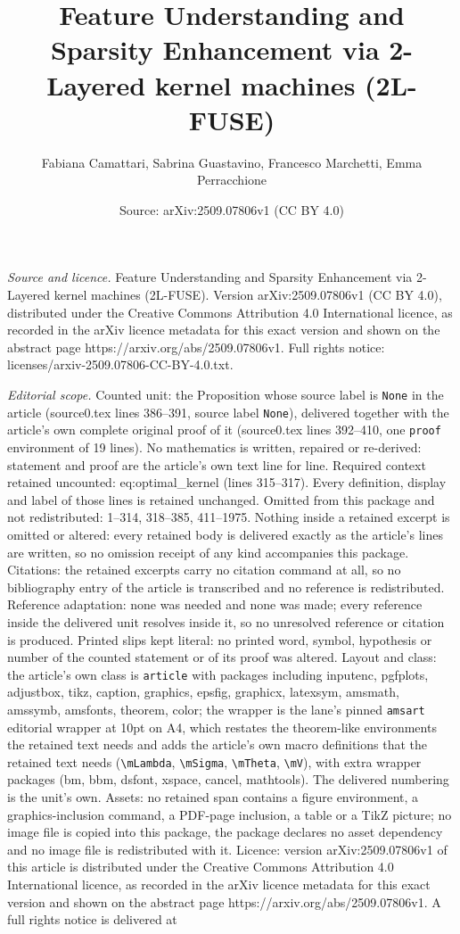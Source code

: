\documentclass[10pt,a4paper]{amsart}
\title[Feature Understanding and Sparsity Enhancement via 2-Layered]{Feature Understanding and Sparsity Enhancement via 2-Layered kernel machines (2L-FUSE)}
\author{Fabiana Camattari, Sabrina Guastavino, Francesco Marchetti, Emma Perracchione}
\date{Source: arXiv:2509.07806v1 (CC BY 4.0)}
\begin{document}
\maketitle

\noindent\emph{Source and licence.} Feature Understanding and Sparsity Enhancement via 2-Layered kernel machines (2L-FUSE). Version arXiv:2509.07806v1 (CC BY 4.0), distributed under the Creative Commons Attribution 4.0 International licence, as recorded in the arXiv licence metadata for this exact version and shown on the abstract page https://arxiv.org/abs/2509.07806v1. Full rights notice: licenses/arxiv-2509.07806-CC-BY-4.0.txt.\par\smallskip

\noindent\textit{Editorial scope.} Counted unit: the Proposition whose source label is \texttt{None} in the article (source0.tex lines 386--391, source label \texttt{None}), delivered together with the article's own complete original proof of it (source0.tex lines 392--410, one \texttt{proof} environment of 19 lines). No mathematics is written, repaired or re-derived: statement and proof are the article's own text line for line. Required context retained uncounted: eq:optimal\_kernel (lines 315--317). Every definition, display and label of those lines is retained unchanged. Omitted from this package and not redistributed: 1--314, 318--385, 411--1975. Nothing inside a retained excerpt is omitted or altered: every retained body is delivered exactly as the article's lines are written, so no omission receipt of any kind accompanies this package. Citations: the retained excerpts carry no citation command at all, so no bibliography entry of the article is transcribed and no reference is redistributed. Reference adaptation: none was needed and none was made; every reference inside the delivered unit resolves inside it, so no unresolved reference or citation is produced. Printed slips kept literal: no printed word, symbol, hypothesis or number of the counted statement or of its proof was altered. Layout and class: the article's own class is \texttt{article} with packages including inputenc, pgfplots, adjustbox, tikz, caption, graphics, epsfig, graphicx, latexsym, amsmath, amssymb, amsfonts, theorem, color; the wrapper is the lane's pinned \texttt{amsart} editorial wrapper at 10pt on A4, which restates the theorem-like environments the retained text needs and adds the article's own macro definitions that the retained text needs (\texttt{\textbackslash mLambda}, \texttt{\textbackslash mSigma}, \texttt{\textbackslash mTheta}, \texttt{\textbackslash mV}), with extra wrapper packages (bm, bbm, dsfont, xspace, cancel, mathtools). The delivered numbering is the unit's own. Assets: no retained span contains a figure environment, a graphics-inclusion command, a PDF-page inclusion, a table or a TikZ picture; no image file is copied into this package, the package declares no asset dependency and no image file is redistributed with it. Licence: version arXiv:2509.07806v1 of this article is distributed under the Creative Commons Attribution 4.0 International licence, as recorded in the arXiv licence metadata for this exact version and shown on the abstract page https://arxiv.org/abs/2509.07806v1. A full rights notice is delivered at 
\end{document}
